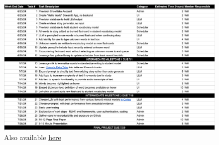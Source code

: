 \documentclass[
	letterpaper, %
]{jdf}
\begin{document}
\begin{figure}[H]
    \centering
    \includegraphics[width=0.9\linewidth]{Project Proposal/project_plan.png}
    \caption{Also available \href{https://docs.google.com/spreadsheets/d/10IeplrSFJeub_BLcY34Mex57YlT-x3DftFnladG2l4g/edit?usp=sharing}{here}}
    \label{Task List}
\end{figure}

\printbibliography{}
\end{document}
